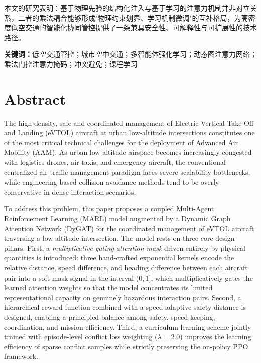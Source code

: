 \documentclass[12pt,a4paper,UTF8]{ctexbook}
\begin{document}
本文的研究表明：基于物理先验的结构化注入与基于学习的注意力机制并非对立关系，二者的乘法耦合能够形成"物理约束划界、学习机制微调"的互补格局，为高密度低空交通的智能化协同管控提供了一条兼具安全性、可解释性与可扩展性的技术路径。

\noindent\textbf{关键词：}低空交通管控；城市空中交通；多智能体强化学习；动态图注意力网络；乘法门控注意力掩码；冲突避免；课程学习

\chapter*{Abstract}

The high-density, safe and coordinated management of Electric Vertical Take-Off and Landing (eVTOL) aircraft at urban low-altitude intersections constitutes one of the most critical technical challenges for the deployment of Advanced Air Mobility (AAM). As urban low-altitude airspace becomes increasingly congested with logistics drones, air taxis, and emergency aircraft, the conventional centralized air traffic management paradigm faces severe scalability bottlenecks, while engineering-based collision-avoidance methods tend to be overly conservative in dense interaction scenarios.

To address this problem, this paper proposes a coupled Multi-Agent Reinforcement Learning (MARL) model augmented by a Dynamic Graph Attention Network (DyGAT) for the coordinated management of eVTOL aircraft traversing a low-altitude intersection. The model rests on three core design pillars. First, a \emph{multiplicative gating attention mask} driven entirely by physical quantities is introduced: three hand-crafted exponential kernels encode the relative distance, speed difference, and heading difference between each aircraft pair into a soft mask signal in the interval $(0,1]$, which multiplicatively gates the learned attention weights so that the model concentrates its limited representational capacity on genuinely hazardous interaction pairs. Second, a hierarchical reward function combined with a speed-adaptive safety distance is designed, enabling a principled balance among safety, speed keeping, coordination, and mission efficiency. Third, a curriculum learning scheme jointly trained with episode-level conflict loss weighting ($\lambda=2.0$) improves the learning efficiency of sparse conflict samples while strictly preserving the on-policy PPO framework.
\end{document}
